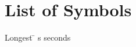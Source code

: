 

\chapter*{List of Symbols}


	

 \noindent
\vspace{-1.75\baselineskip}
  \begin{tabbing}
Longest \=  \kill 
s \>  seconds\\ %




\end{tabbing}